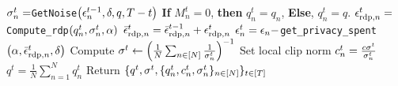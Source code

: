 \begin{minipage}{0.47\textwidth}
\begin{algorithm}[H]
\begin{algorithmic}[1]
\State  $\sigma_n^t=$\texttt{GetNoise}$\left({\epsilon}_n^{t-1},\delta, q, T-t\right)$
\State \textbf{If} $M_n^t=0$, \textbf{then} $q_n^t = q_n$, \textbf{Else}, $q_n^t = q$.
\State ${\epsilon}_{\text{rdp}, n}^t=$\texttt{Compute\_rdp}$\left(q_n^t,\sigma_n^t, \alpha\right)$
\State $\bar{{\epsilon}}_{\text{rdp},n}^t = \bar{{\epsilon}}_{\text{rdp},n}^{t-1} +  {\epsilon}_{\text{rdp}, n}^t$
\State ${\epsilon}_n^t={\epsilon}_n-$\texttt{get\_privacy\_spent}$\left(\alpha, \bar{{\epsilon}}_{\text{rdp},n}^t,\delta\right)$
\EndFor
\State Compute $\sigma^t \gets \left(\frac{1}{N}\sum_{n\in [N]}\frac{1}{\sigma_n^t}\right)^{-1}$
\State Set local clip norm $c_n^t=\frac{c\sigma^t}{\sigma_n^t}$
\EndFor
\State $q^t = \frac{1}{N} \sum_{n=1}^N q_n^t$
\EndFor
\State Return $\{q^t, \sigma^t, \{q_n^t, c_n^t, \sigma_n^t\}_{n\in [N]}\}_{t\in [T]}$
\end{algorithmic}
\end{algorithm}
\end{minipage}%
\hspace{1em} 
